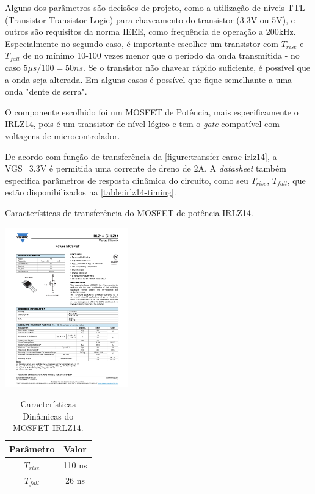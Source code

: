 	Alguns dos parâmetros são decisões de projeto, como a utilização de níveis TTL (Transistor Transistor Logic) para chaveamento do transistor (3.3V ou 5V), e outros são requisitos da norma IEEE, como frequência de operação a 200kHz. Especialmente no segundo caso, é importante escolher um transistor com $T_{rise}$ e $T_{fall}$ de no mínimo 10-100 vezes menor que o período da onda transmitida - no caso $5\mu$$s/100 = 50ns$. Se o transistor não chavear rápido suficiente, é possível que a onda seja alterada. Em alguns casos é possível que fique semelhante a uma onda "dente de serra".
	
	O componente escolhido foi um MOSFET de Potência, mais especificamente o IRLZ14, pois é um transistor de nível lógico e tem o \textit{gate} compatível com voltagens de microcontrolador. 

	De acordo com função de transferência da \autoref{figure:transfer-carac-irlz14}, a VGS=3.3V é permitida uma corrente de dreno de 2A. A \textit{datasheet} também especifica parâmetros de resposta dinâmica do circuito, como seu $T_{rise}$, $T_{fall}$, que estão disponibilizados na \autoref{table:irlz14-timing}.
	
	\begin{chart}[h]
		\caption{\label{figure:transfer-carac-irlz14}Características de transferência do MOSFET de potência IRLZ14.}
		\centering
		\includegraphics[page=3, width=0.4\textwidth, trim={12cm 16.5cm 2.2cm 5cm}, clip]{circuits/irlz14.pdf}
	\end{chart}

	\begin{table}[h]
		\caption{Características Dinâmicas do MOSFET IRLZ14.}
		\centering
		\begin{tabular}{c c}
			\hline
			Parâmetro  & Valor  \\ \hline
			$T_{rise}$ & 110 ns \\
			$T_{fall}$ & 26 ns  \\ \hline
		\end{tabular}
		\label{table:irlz14-timing}
	\end{table}

